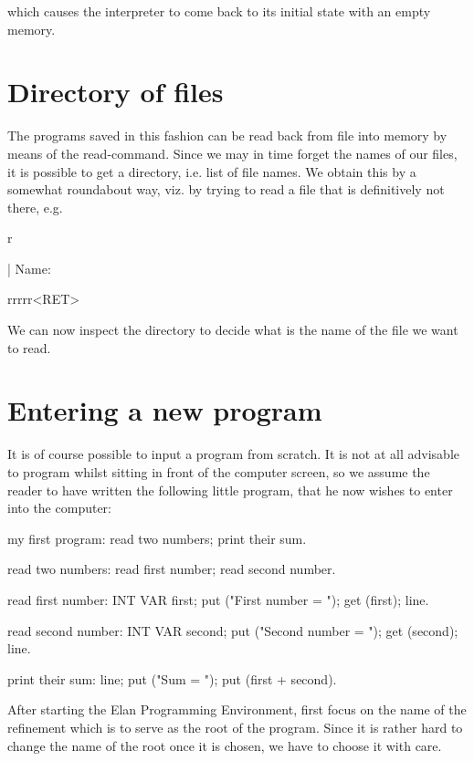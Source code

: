 \noindent
which causes the interpreter to come back to its initial state
with an empty memory.

\section{Directory of files}

The programs saved in this fashion can be read back from file
into memory by means of the read-command. Since we may in time
forget the names of our files, it is possible to get a directory,
i.e. list of file names. We obtain this by a somewhat roundabout
way, viz. by trying to read a file that is definitively not there,
e.g.

\begin{elan}
        r

|       Name:\cursor

        rrrrr<RET>
\end{elan}

\noindent
We can now inspect the directory to decide what is the name of
the file we want to read.

\section{Entering a new program}

It is of course possible to input a program from scratch.
It is not at all advisable to program whilst sitting in front
of the computer screen, so we assume the reader to have written
the following little program, that he now wishes to enter into
the computer:

\begin{elan}
        my first program:
          read two numbers;
       	  print their sum.

        read two numbers:
          read first number;
          read second number.

        read first number:
          INT VAR first;
          put ("First number = ");
          get (first);
          line.

        read second number:
          INT VAR second;
          put ("Second number = ");
          get (second);
          line.

        print their sum:
          line;
          put ("Sum = ");
          put (first + second).
\end{elan}

After starting the Elan Programming Environment, first focus
on the name of the refinement which is to serve as the root
of the program.
Since it is rather hard to change the name of the root once
it is chosen, we have to choose it with care.

